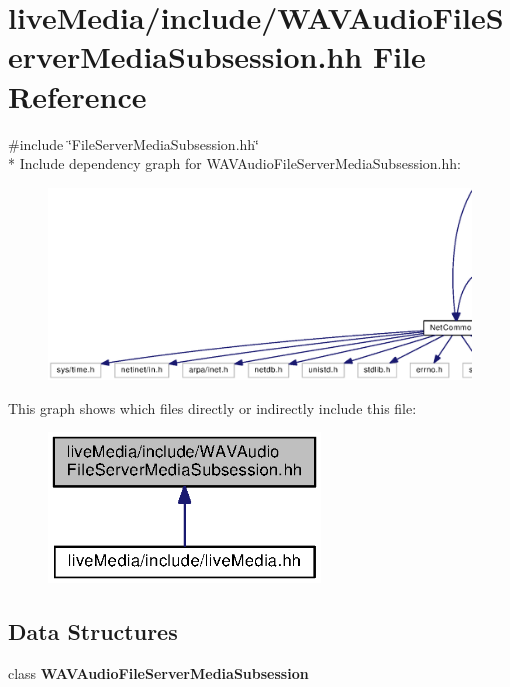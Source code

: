 \section{live\+Media/include/\+W\+A\+V\+Audio\+File\+Server\+Media\+Subsession.hh File Reference}
\label{WAVAudioFileServerMediaSubsession_8hh}
{\ttfamily \#include \char`\"{}File\+Server\+Media\+Subsession.\+hh\char`\"{}}\\*
Include dependency graph for W\+A\+V\+Audio\+File\+Server\+Media\+Subsession.\+hh\+:
\nopagebreak
\begin{figure}[H]
\begin{center}
\leavevmode
\includegraphics[width=350pt]{WAVAudioFileServerMediaSubsession_8hh__incl}
\end{center}
\end{figure}
This graph shows which files directly or indirectly include this file\+:
\nopagebreak
\begin{figure}[H]
\begin{center}
\leavevmode
\includegraphics[width=205pt]{WAVAudioFileServerMediaSubsession_8hh__dep__incl}
\end{center}
\end{figure}
\subsection*{Data Structures}
\begin{DoxyCompactItemize}
\item 
class {\bf W\+A\+V\+Audio\+File\+Server\+Media\+Subsession}
\end{DoxyCompactItemize}
